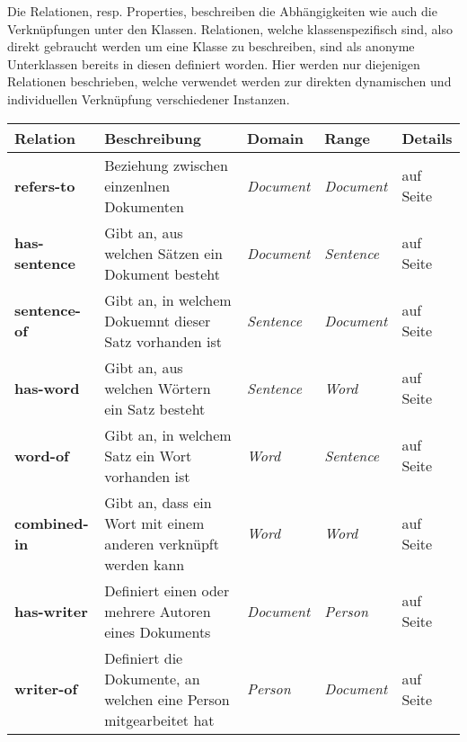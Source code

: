 \documentclass[
    11pt,
    latin1,
    a4paper,
    oneside
]{scrreprt}
\begin{document}
Die Relationen, resp. Properties, beschreiben die Abh\"angigkeiten wie auch die Verkn\"upfungen unter den Klassen. Relationen, welche klassenspezifisch sind, also direkt gebraucht werden um eine Klasse zu beschreiben, sind als anonyme Unterklassen bereits in diesen definiert worden. Hier werden nur diejenigen Relationen beschrieben, welche verwendet werden zur direkten dynamischen und individuellen Verkn\"upfung verschiedener Instanzen.

\begin{table}[h]
  \centering
  \begin{tabular}{ | l | p{4cm} | p{3cm} | l | p{3cm} | }
    \hline
    \textbf{Relation} & \textbf{Beschreibung} & \textbf{Domain} & \textbf{Range} & \textbf{Details} \\ \hline
    
    \textbf{refers-to} & Beziehung zwischen einzenlnen Dokumenten & \emph{Document} & \emph{Document} & \nameref{sec:rel_refersto} auf Seite \pageref{sec:rel_refersto} \\ \hline
    \textbf{has-sentence} & Gibt an, aus welchen S\"atzen ein Dokument besteht & \emph{Document} & \emph{Sentence} & \nameref{sec:rel_hassentence} auf Seite \pageref{sec:rel_hassentence} \\ \hline
    \textbf{sentence-of} & Gibt an, in welchem Dokuemnt dieser Satz vorhanden ist & \emph{Sentence} & \emph{Document} & \nameref{sec:rel_sentenceof} auf Seite \pageref{sec:rel_sentenceof} \\ \hline
    \textbf{has-word} & Gibt an, aus welchen W\"ortern ein Satz besteht & \emph{Sentence} & \emph{Word} & \nameref{sec:rel_hasword} auf Seite \pageref{sec:rel_hasword} \\ \hline
    \textbf{word-of} & Gibt an, in welchem Satz ein Wort vorhanden ist & \emph{Word} & \emph{Sentence} & \nameref{sec:rel_wordof} auf Seite \pageref{sec:rel_wordof} \\ \hline
    \textbf{combined-in} & Gibt an, dass ein Wort mit einem anderen verkn\"upft werden kann & \emph{Word} & \emph{Word} & \nameref{sec:rel_wordcombo} auf Seite \pageref{sec:rel_wordcombo} \\ \hline
    
    \textbf{has-writer} & Definiert einen oder mehrere Autoren eines Dokuments & \emph{Document} & \emph{Person} & \nameref{sec:rel_haswriter} auf Seite \pageref{sec:rel_haswriter} \\ \hline
    \textbf{writer-of} & Definiert die Dokumente, an welchen eine Person mitgearbeitet hat & \emph{Person} & \emph{Document} & \nameref{sec:rel_writerof} auf Seite \pageref{sec:rel_writerof} \\ \hline
    

\end{tabular}
\end{table}
\end{document}
